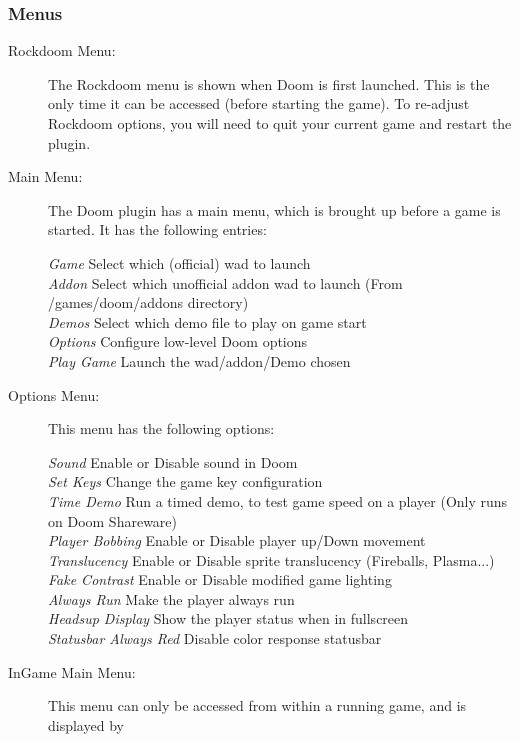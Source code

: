 \subsubsection{Menus}
\begin{description}
  \item[Rockdoom Menu: ] The Rockdoom menu is shown when Doom is first launched.  
This is the only time it can be accessed (before starting the game).  To re-adjust 
Rockdoom options, you will need to quit your current game and restart the plugin.
  \item[Main Menu: ]
  The Doom plugin has a main menu, which is brought up before a game is started. It 
  has the following entries:
  
  \emph{Game } Select which (official) wad to launch\\
  \emph{Addon } Select which unofficial addon wad to launch (From /games/doom/addons directory)\\
  \emph{Demos } Select which demo file to play on game start\\
  \emph{Options } Configure low-level Doom options\\
  \emph{Play Game } Launch the wad/addon/Demo chosen%
  
  \item[Options Menu: ]This menu has the following options:
  
  \emph{Sound } Enable or Disable sound in Doom\\
  \emph{Set Keys }  Change the game key configuration\\
  \emph{Time Demo } Run a timed demo, to test game speed on a player (Only runs on Doom Shareware)\\
  \emph{Player Bobbing } Enable or Disable player up/Down movement\\
  \emph{Translucency } Enable or Disable sprite translucency (Fireballs, Plasma...)\\
  \emph{Fake Contrast} Enable or Disable modified game lighting\\
  \emph{Always Run} Make the player always run\\
  \emph{Headsup Display} Show the player status when in fullscreen\\
  \emph{Statusbar Always Red} Disable color response statusbar%

  \item[InGame Main Menu: ]This menu can only be accessed from within a running game, and is displayed by  


\end{description}
